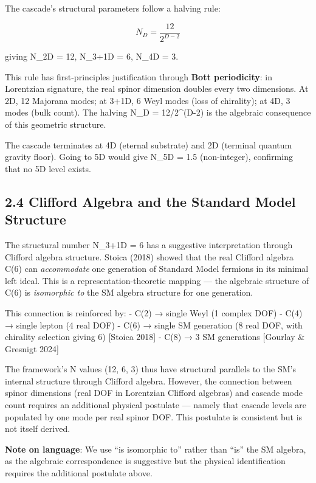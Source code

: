\documentclass[11pt,a4paper]{article}
\begin{document}
The cascade's structural parameters follow a halving rule:

\[N_D = \frac{12}{2^{D-2}}\]

giving N\_2D = 12, N\_3+1D = 6, N\_4D = 3.

This rule has first-principles justification through \textbf{Bott
periodicity}: in Lorentzian signature, the real spinor dimension doubles
every two dimensions. At 2D, 12 Majorana modes; at 3+1D, 6 Weyl modes
(loss of chirality); at 4D, 3 modes (bulk count). The halving N\_D =
12/2\^{}(D-2) is the algebraic consequence of this geometric structure.

The cascade terminates at 4D (eternal substrate) and 2D (terminal
quantum gravity floor). Going to 5D would give N\_5D = 1.5
(non-integer), confirming that no 5D level exists.

\hypertarget{clifford-algebra-and-the-standard-model-structure}{%
\subsection{2.4 Clifford Algebra and the Standard Model
Structure}\label{clifford-algebra-and-the-standard-model-structure}}

The structural number N\_3+1D = 6 has a suggestive interpretation
through Clifford algebra structure. Stoica (2018) showed that the real
Clifford algebra C(6) can \emph{accommodate} one generation of Standard
Model fermions in its minimal left ideal. This is a
representation-theoretic mapping --- the algebraic structure of C(6) is
\emph{isomorphic to} the SM algebra structure for one generation.

This connection is reinforced by: - C(2) → single Weyl (1 complex DOF) -
C(4) → single lepton (4 real DOF) - C(6) → single SM generation (8 real
DOF, with chirality selection giving 6) {[}Stoica 2018{]} - C(8) → 3 SM
generations {[}Gourlay \& Gresnigt 2024{]}

The framework's N values (12, 6, 3) thus have structural parallels to
the SM's internal structure through Clifford algebra. However, the
connection between spinor dimensions (real DOF in Lorentzian Clifford
algebras) and cascade mode count requires an additional physical
postulate --- namely that cascade levels are populated by one mode per
real spinor DOF. This postulate is consistent but is not itself derived.

\textbf{Note on language}: We use ``is isomorphic to'' rather than
``is'' the SM algebra, as the algebraic correspondence is suggestive but
the physical identification requires the additional postulate above.
\end{document}
